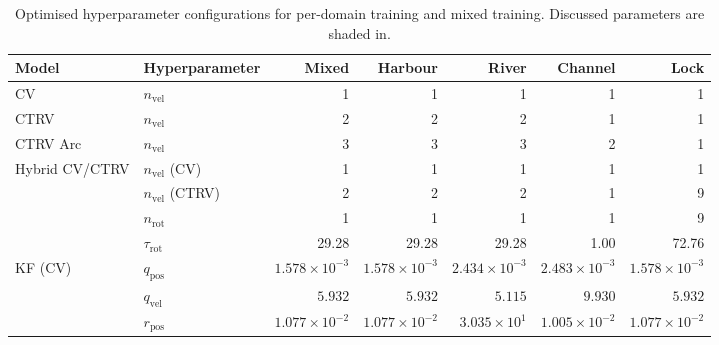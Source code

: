 \begin{table}[htbp] %
\centering
\vspace{-1em}%
\caption[Exp. II Optimised Hyperparameter Configurations]{Optimised hyperparameter configurations for per-domain training and mixed training. Discussed parameters are shaded in.}
\label{tab:hpo_results_merged}
\vspace{-0.3em} %
\fontsize{9pt}{9.5pt}\selectfont
\renewcommand{\arraystretch}{0.85} %
\setlength{\tabcolsep}{3pt}
\begin{tabular}{llrrrrr}
\toprule
\textbf{Model} & \textbf{Hyperparameter} & \textbf{Mixed} & \textbf{Harbour} & \textbf{River} & \textbf{Channel} & \textbf{Lock} \\
\midrule
CV             & $n_\text{vel}$        & 1      & 1     & 1     & 1     & 1     \\
CTRV           & $n_\text{vel}$        & 2      & 2     & 2     & \cellcolor{cyan!15}1     & 1     \\
CTRV Arc       & $n_\text{vel}$        & 3      & 3     & 3     & \cellcolor{cyan!15}2     & 1     \\
Hybrid CV/CTRV & $n_\text{vel}$ (CV)   & 1      & 1     & 1     & 1     & 1     \\
               & $n_\text{vel}$ (CTRV) & 2      & 2     & 2     & \cellcolor{cyan!15}1     & \cellcolor{orange!15}9     \\
               & $n_\text{rot}$        & 1      & 1     & 1     & 1     & \cellcolor{orange!15}9     \\
               & $\tau_\text{rot}$     & 29.28  & 29.28 & 29.28 & 1.00  & \cellcolor{orange!15}72.76 \\
\midrule
KF (CV)        & $q_\text{pos}$        & $1.578 \times 10^{-3}$ & $1.578 \times 10^{-3}$ & $2.434 \times 10^{-3}$ & $2.483 \times 10^{-3}$ & $1.578 \times 10^{-3}$ \\
               & $q_\text{vel}$        & $5.932$                & $5.932$                & $5.115$                & $9.930$                & $5.932$                \\
               & $r_\text{pos}$        & $1.077 \times 10^{-2}$ & $1.077 \times 10^{-2}$ & $3.035 \times 10^{1}$  & $1.005 \times 10^{-2}$ & $1.077 \times 10^{-2}$ \\

\end{tabular}
\end{table}
